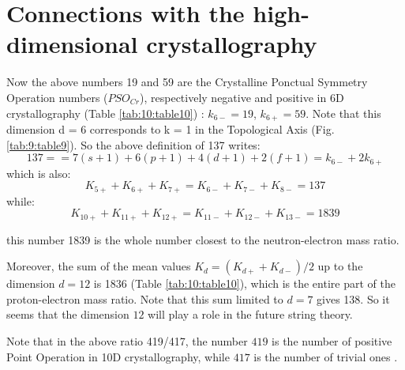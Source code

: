 \documentclass[a4paper,9pt]{article}
\begin{document}
 
 
 
 
 
 
 
 
 \section{Connections with the high-dimensional crystallography}
 
 Now the above numbers 19 and 59 are the Crystalline Ponctual Symmetry Operation numbers ($PSO_{Cr}$), respectively negative and positive in 6D crystallography \cite{Weigel} (Table \ref{tab:10:table10}) : $k_{6-} = 19$, $k_{6+} = 59$. Note that this dimension d = 6 corresponds to k = 1 in the Topological Axis (Fig. \ref{tab:9:table9}). So the above definition of 137 writes:
  \begin{equation}
   137 =   = 7(s +1) + 6(p +1) + 4(d +1) + 2(f +1) = k_{6-} + 2k_{6+}   
    \end{equation}
    which is also:
    \begin{equation}
    K_{5+}+K_{6+}+K_{7+} = K_{6-} + K_{7-} +K_{8-} = 137   
    \end{equation}
    while:
    \begin{equation}
    K_{10+} +K_{11+}+K_{12+} = K_{11-} +K_{12-}+K_{13-} = 1839   
    \end{equation}
    
    this number 1839 is the whole number closest to the neutron-electron mass ratio.


    
    Moreover, the sum of the mean values $K_{d} = (K_{d+} + K_{d-})/2$ up to the dimension $d = 12$ is 1836 (Table \ref{tab:10:table10}), which is the entire part of the proton-electron mass ratio. Note that this sum limited to $d = 7$ gives 138. So it seems that the dimension $12$ will play a role in the future string theory.
    
    
    Note that in the  above ratio 419/417, the number $419$ is the number of positive Point Operation in 10D crystallography, while $417$ is the number of trivial ones .
\end{document}
